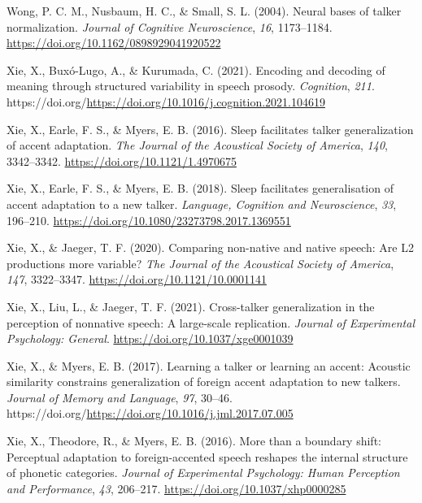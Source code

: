 \documentclass[
  11pt,
  english,
  man,floatsintext]{apa6}
\newlength{\cslhangindent}
\newlength{\cslentryspacingunit} %
\newenvironment{CSLReferences}[2] %
 {%
  \setlength{\parindent}{0pt}
  \ifodd #1
  \let\oldpar\par
  \def\par{\hangindent=\cslhangindent\oldpar}
  \fi
  \setlength{\parskip}{#2\cslentryspacingunit}
 }%
 {}
\begin{document}
\begin{CSLReferences}{1}{0}
\leavevmode{}%
Wong, P. C. M., Nusbaum, H. C., \& Small, S. L. (2004). Neural bases of talker normalization. \emph{Journal of Cognitive Neuroscience}, \emph{16}, 1173--1184. \url{https://doi.org/10.1162/0898929041920522}

\leavevmode{}%
Xie, X., Buxó-Lugo, A., \& Kurumada, C. (2021). Encoding and decoding of meaning through structured variability in speech prosody. \emph{Cognition}, \emph{211}. https://doi.org/\url{https://doi.org/10.1016/j.cognition.2021.104619}

\leavevmode{}%
Xie, X., Earle, F. S., \& Myers, E. B. (2016). Sleep facilitates talker generalization of accent adaptation. \emph{The Journal of the Acoustical Society of America}, \emph{140}, 3342--3342. \url{https://doi.org/10.1121/1.4970675}

\leavevmode{}%
Xie, X., Earle, F. S., \& Myers, E. B. (2018). Sleep facilitates generalisation of accent adaptation to a new talker. \emph{Language, Cognition and Neuroscience}, \emph{33}, 196--210. \url{https://doi.org/10.1080/23273798.2017.1369551}

\leavevmode{}%
Xie, X., \& Jaeger, T. F. (2020). Comparing non-native and native speech: Are L2 productions more variable? \emph{The Journal of the Acoustical Society of America}, \emph{147}, 3322--3347. \url{https://doi.org/10.1121/10.0001141}

\leavevmode{}%
Xie, X., Liu, L., \& Jaeger, T. F. (2021). Cross-talker generalization in the perception of nonnative speech: A large-scale replication. \emph{Journal of Experimental Psychology: General}. \url{https://doi.org/10.1037/xge0001039}

\leavevmode{}%
Xie, X., \& Myers, E. B. (2017). Learning a talker or learning an accent: Acoustic similarity constrains generalization of foreign accent adaptation to new talkers. \emph{Journal of Memory and Language}, \emph{97}, 30--46. https://doi.org/\url{https://doi.org/10.1016/j.jml.2017.07.005}

\leavevmode{}%
Xie, X., Theodore, R., \& Myers, E. B. (2016). More than a boundary shift: Perceptual adaptation to foreign-accented speech reshapes the internal structure of phonetic categories. \emph{Journal of Experimental Psychology: Human Perception and Performance}, \emph{43}, 206--217. \url{https://doi.org/10.1037/xhp0000285}


\end{CSLReferences}
\end{document}

